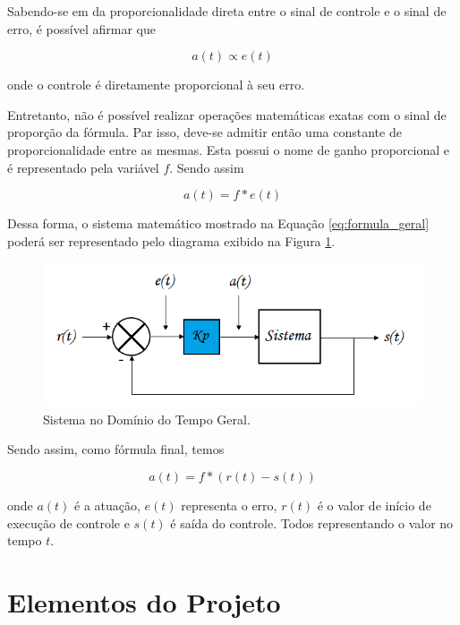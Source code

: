 \documentclass[portugues, brazil, a4paper,12pt]{article}
\begin{document}
		Sabendo-se em da proporcionalidade direta entre o sinal de controle e o sinal de erro, é possível afirmar que

		\begin{equation}
			a(t) \propto e(t)
		\end{equation}

		onde o controle é diretamente proporcional à seu erro.

		Entretanto, não é possível realizar operações matemáticas exatas com o sinal de proporção da fórmula. Par isso, deve-se admitir então uma constante de proporcionalidade entre as mesmas. Esta possui o nome de ganho proporcional e é representado pela variável $f$. Sendo assim

		\begin{equation}
			a(t) = f * e(t) \label{eq:formula_geral}
		\end{equation}

		Dessa forma, o sistema matemático mostrado na Equação \ref{eq:formula_geral} poderá ser representado pelo diagrama exibido na Figura \ref{fig:sistema_dominio_tempo}.

		\begin{figure}[H]
			\centering
			\includegraphics[width=\linewidth]{img/math-diagrama_geral.png}
			\caption{Sistema no Domínio do Tempo Geral.}
			\label{fig:sistema_dominio_tempo}
		\end{figure}

		Sendo assim, como fórmula final, temos

		\begin{equation}
			a(t) = f * (r(t) - s(t))
		\end{equation}

		onde $a(t)$ é a atuação, $e(t)$ representa o erro, $ r(t) $ é o valor de início de execução de controle e $ s(t) $ é saída do controle. Todos representando o valor no tempo $t$.


\section{Elementos do Projeto} \label{sec:elem-teo}
\end{document}

